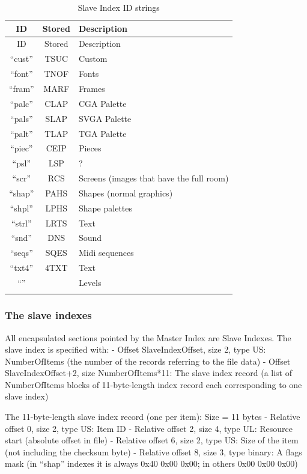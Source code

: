\documentclass{article}
\begin{document}
\renewcommand{\tabcolsep}{0.5em}
\begin{longtable}{ccl}
 \hline
 ID    & Stored& Description \\
 \hline
 \endfirsthead
 \hline
 ID    & Stored& Description \\
 \hline
 \endhead
 ``cust''& TSUC  & Custom  \\
 ``font''& TNOF  & Fonts \\
 ``fram''& MARF  & Frames \\
 ``palc''& CLAP  & CGA Palette \\
 ``pals''& SLAP  & SVGA Palette \index{palette} \\
 ``palt''& TLAP  & TGA Palette \\
 ``piec''& CEIP  & Pieces   \\
 ``psl'' & LSP\textvisiblespace  & ?  \\
 ``scr'' & RCS\textvisiblespace  & Screens (images that have the full room) \\
 ``shap''& PAHS  & Shapes (normal graphics) \\
 ``shpl''& LPHS  & Shape palettes \\
 ``strl''& LRTS  & Text \\
 ``snd'' & DNS\textvisiblespace  & Sound \\
 ``seqs''& SQES  & Midi sequences \\
 ``txt4''& 4TXT  & Text \\
 ``''    & \textvisiblespace\textvisiblespace\textvisiblespace\textvisiblespace  & Levels \\
\hline
\caption{Slave Index ID strings}
\label{slave indexes}
\end{longtable}

\subsubsection{The slave indexes \label{slave indexes}} %
 All encapsulated sections pointed by the Master Index are Slave Indexes.
 The slave index is specified with:
  - Offset SlaveIndexOffset,   size 2, type US: NumberOfItems
           (the number of the records referring to the file data)
  - Offset SlaveIndexOffset+2, size NumberOfItems*11: The slave index
           record (a list of NumberOfItems blocks of 11-byte-length index
           record each corresponding to one slave index)

 The 11-byte-length slave index record (one per item): Size = 11 bytes
  - Relative offset 0, size 2, type US: Item ID
  - Relative offset 2, size 4, type UL: Resource start
           (absolute offset in file)
  - Relative offset 6, size 2, type US: Size of the item
           (not including the checksum byte)
  - Relative offset 8, size 3, type binary: A flags mask
           (in ``shap'' indexes it is always 0x40 0x00 0x00;
           in others 0x00 0x00 0x00)
\end{document}
